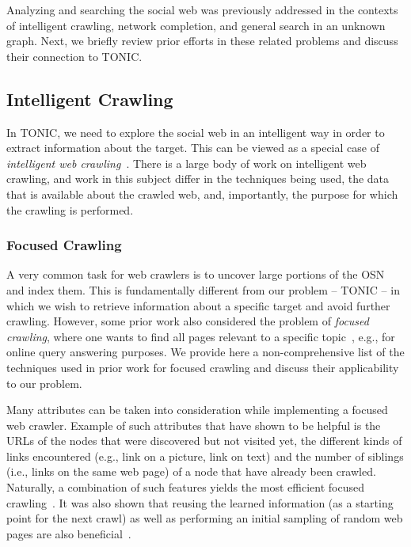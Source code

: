 \documentclass[journal]{IEEEtran}
\begin{document}


Analyzing and searching the social web was previously addressed in the contexts of intelligent crawling, network completion, and general search in an unknown graph. Next, we briefly review prior efforts in these related problems and discuss their connection to TONIC.


\subsection{Intelligent Crawling}
\label{sec:webCrawling}
In TONIC, we need to explore the social web in an intelligent way in order to extract information about the target. This can be viewed as a special case of {\em intelligent web crawling}~\cite{aggarwal2001intelligent,zareh2007fica,cai2008irobot}. %
There is a large body of work on intelligent web crawling, and work in this subject differ in the techniques being used, the data that is available about the crawled web, and, importantly, the purpose for which the crawling is performed. 


\subsubsection{Focused Crawling}
A very common task for web crawlers is to uncover large portions of the OSN and index them. This is fundamentally different from our problem -- TONIC -- in which we wish to retrieve information about a specific target and avoid further crawling. However, some prior work also considered the problem of {\em focused crawling}, where one wants to find  all pages relevant to a specific topic~\cite{diligenti2000focused,menczer2001evaluating}, e.g., for online query answering purposes. We provide here a non-comprehensive list of the techniques used in prior work for focused crawling and discuss their applicability to our problem. 



Many attributes can be taken into consideration while implementing a focused web crawler. Example of such attributes that have shown to be helpful is the URLs of the nodes that were discovered but not visited yet, the different kinds of links encountered (e.g., link on a picture, link on text) and the number of siblings (i.e., links on the same web page) of a node that have already been crawled. Naturally, a combination of such features yields the most efficient focused crawling~\cite{aggarwal2001intelligent}.
It was also shown that reusing the learned information (as a starting point for the next crawl) as well as performing an initial sampling of random web pages are also beneficial~\cite{cai2008irobot}.
 
\end{document}
